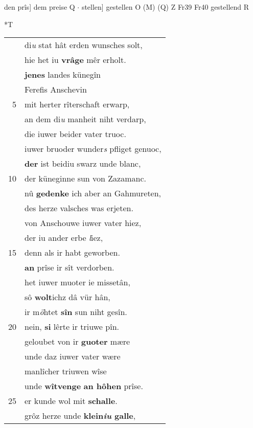 \documentclass[8pt,a4paper,notitlepage]{article}
\begin{document}
\begin{table}[ht]
\begin{minipage}[t]{0.5\linewidth}
den prîs] dem preise Q  $\cdot$ stellen] gestellen O (M) (Q) Z Fr39 Fr40 gestellend R \newline
\end{minipage}
\hspace{0.5cm}
\begin{minipage}[t]{0.5\linewidth}
\small
\begin{center}*T
\end{center}
\begin{tabular}{rl}
 & di\textit{u} stat hât erden wunsches solt,\\ 
 & hie het iu \textbf{vrâge} mêr erholt.\\ 
 & \textbf{jenes} landes künegîn\\ 
 & Ferefis Anschevin\\ 
5 & mit herter rîterschaft erwarp,\\ 
 & an dem di\textit{u} manheit niht verdarp,\\ 
 & die iuwer beider vater truoc.\\ 
 & iuwer bruoder wunder\textit{s} pfliget genuoc,\\ 
 & \textbf{der} ist beidiu swarz unde blanc,\\ 
10 & der küneginne sun von Zazamanc.\\ 
 & nû \textbf{gedenke} ich aber an Gahmureten,\\ 
 & des herze valsches was erjeten.\\ 
 & von Anschouwe iuwer vater hiez,\\ 
 & der iu ander erbe \textit{l}iez,\\ 
15 & denn als ir habt geworben.\\ 
 & \textbf{an} prîse ir sît verdorben.\\ 
 & het iuwer muoter ie missetân,\\ 
 & sô \textbf{wolt}ichz dâ vür hân,\\ 
 & ir m\textit{ö}htet \textbf{sîn} sun niht gesîn.\\ 
20 & nein, \textbf{si} lêrte ir triuwe pîn.\\ 
 & geloubet von ir \textbf{guoter} mære\\ 
 & unde daz iuwer vater wære\\ 
 & manlîcher triuwen wîse\\ 
 & unde \textbf{wîtvenge} \textbf{an hôhen} prîse.\\ 
25 & er kunde wol mit \textbf{schalle}.\\ 
 & grôz herze unde \textbf{klein\textit{iu} galle},\\ 

\end{tabular}
\end{minipage}
\end{table}
\end{document}

